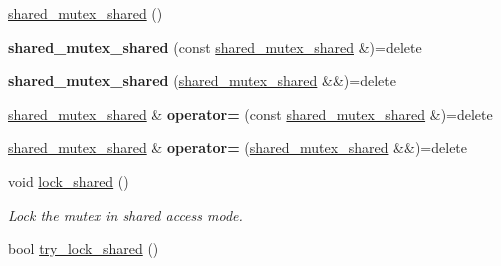 \begin{DoxyCompactItemize}
\item 
\hyperlink{classcpen333_1_1thread_1_1impl_1_1shared__mutex__shared_a36db88415158bfa99efca5b8bbc70533}{shared\+\_\+mutex\+\_\+shared} ()
\item 
\mbox{\label{classcpen333_1_1thread_1_1impl_1_1shared__mutex__shared_a7c740f7885221dd5c83b0999f100b96f}} 
{\bfseries shared\+\_\+mutex\+\_\+shared} (const \hyperlink{classcpen333_1_1thread_1_1impl_1_1shared__mutex__shared}{shared\+\_\+mutex\+\_\+shared} \&)=delete
\item 
\mbox{\label{classcpen333_1_1thread_1_1impl_1_1shared__mutex__shared_ada6858bc7fbb63f1c6b0d8f2979dbb17}} 
{\bfseries shared\+\_\+mutex\+\_\+shared} (\hyperlink{classcpen333_1_1thread_1_1impl_1_1shared__mutex__shared}{shared\+\_\+mutex\+\_\+shared} \&\&)=delete
\item 
\mbox{\label{classcpen333_1_1thread_1_1impl_1_1shared__mutex__shared_a4f05a179ee7b702005749a6a22c0ae77}} 
\hyperlink{classcpen333_1_1thread_1_1impl_1_1shared__mutex__shared}{shared\+\_\+mutex\+\_\+shared} \& {\bfseries operator=} (const \hyperlink{classcpen333_1_1thread_1_1impl_1_1shared__mutex__shared}{shared\+\_\+mutex\+\_\+shared} \&)=delete
\item 
\mbox{\label{classcpen333_1_1thread_1_1impl_1_1shared__mutex__shared_a53ab9eb874944c9f47e43dbee38d4e7a}} 
\hyperlink{classcpen333_1_1thread_1_1impl_1_1shared__mutex__shared}{shared\+\_\+mutex\+\_\+shared} \& {\bfseries operator=} (\hyperlink{classcpen333_1_1thread_1_1impl_1_1shared__mutex__shared}{shared\+\_\+mutex\+\_\+shared} \&\&)=delete
\item 
void \hyperlink{classcpen333_1_1thread_1_1impl_1_1shared__mutex__shared_a16b3ba22ee6190696e7c333379e786d3}{lock\+\_\+shared} ()
\begin{DoxyCompactList}\small\item\em Lock the mutex in shared access mode. \end{DoxyCompactList}\item 
bool \hyperlink{classcpen333_1_1thread_1_1impl_1_1shared__mutex__shared_a147d8ab59cf14fd567135542c2302c4f}{try\+\_\+lock\+\_\+shared} ()

\end{DoxyCompactItemize}
